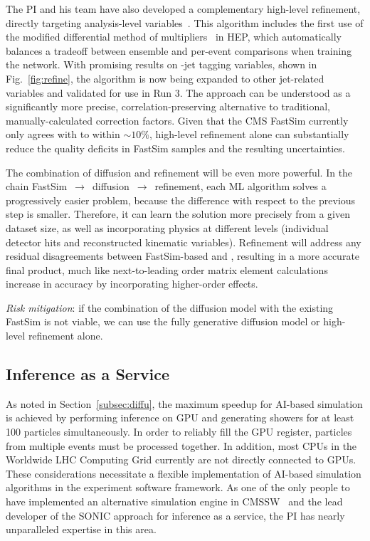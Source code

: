 The PI and his team have also developed a complementary high-level refinement, directly targeting analysis-level variables~\cite{Bein:2023ylt}.
This algorithm includes the first use of the modified differential method of multipliers~\cite{Platt:1987} in HEP,
which automatically balances a tradeoff between ensemble and per-event comparisons when training the network.
With promising results on \cPqb-jet tagging variables, shown in Fig.~\ref{fig:refine},
the algorithm is now being expanded to other jet-related variables and validated for use in Run 3.
The approach can be understood as a significantly more precise, correlation-preserving alternative to traditional, manually-calculated correction factors.
Given that the CMS FastSim currently only agrees with \GEANTfour to within ${\sim}10\%$,
high-level refinement alone can substantially reduce the quality deficits in FastSim samples and the resulting uncertainties.

The combination of diffusion and refinement will be even more powerful.
In the chain FastSim~$\to$~diffusion~$\to$~refinement, each ML algorithm solves a progressively easier problem,
because the difference with respect to the previous step is smaller.
Therefore, it can learn the solution more precisely from a given dataset size,
as well as incorporating physics at different levels (individual detector hits and reconstructed kinematic variables).
Refinement will address any residual disagreements between FastSim-based \diffu and \GEANTfour,
resulting in a more accurate final product, much like next-to-leading order matrix element calculations increase in accuracy by incorporating higher-order effects.

\textit{Risk mitigation}: if the combination of the diffusion model with the existing FastSim is not viable,
we can use the fully generative diffusion model or high-level refinement alone.

\subsection{Inference as a Service}\label{subsec:iaas}

As noted in Section~\ref{subsec:diffu}, the maximum speedup for AI-based simulation is achieved by performing inference on GPU
and generating showers for at least 100 particles simultaneously.
In order to reliably fill the GPU register, particles from multiple events must be processed together.
In addition, most CPUs in the Worldwide LHC Computing Grid currently are not directly connected to GPUs.
These considerations necessitate a flexible implementation of AI-based simulation algorithms in the experiment software framework.
As one of the only people to have implemented an alternative simulation engine in CMSSW~\cite{Pedro:2020kbk}
and the lead developer of the SONIC approach for inference as a service,
the PI has nearly unparalleled expertise in this area.

